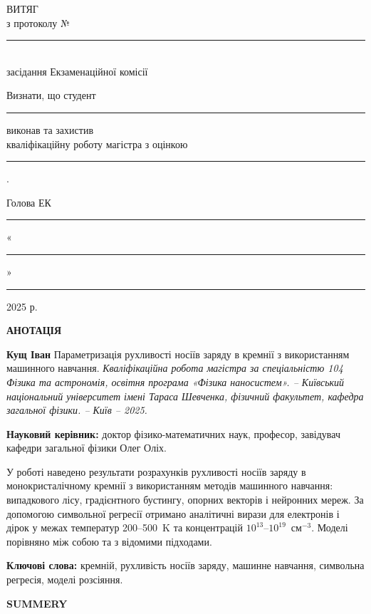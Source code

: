 \documentclass[14pt,a4paper,titlepage,oneside]{book}
\numberwithin{equation}{part}
\begin{document}
  \newpage
  \thispagestyle{empty}
  \begin{center}
  \Large ВИТЯГ \\[5mm]
  \large з протоколу №\rule{3cm}{0.4pt} \\[3mm]
  засідання Екзаменаційної комісії\\[10mm]
  
  \begin{minipage}{0.9\textwidth}

  Визнати, що студент \rule{8cm}{0.4pt} виконав та захистив\\
  кваліфікаційну роботу магістра з оцінкою \rule{4cm}{0.4pt}.\\[15mm]
  \end{minipage}
  
  Голова ЕК \rule{6cm}{0.4pt} \hfill «\rule{1cm}{0.4pt}» \rule{3cm}{0.4pt} 2025 р.
  \end{center}
  \newpage
  \begin{center}
      \Large \textbf{АНОТАЦІЯ }
  \end{center}

  \justifying
  \textbf{Кущ Іван} Параметризація рухливості носіїв заряду в кремнії з використанням машинного навчання. \textit{Кваліфікаційна робота магістра за спеціальністю 104 Фізика та астрономія, освітня програма «Фізика наносистем». – Київський національний університет імені Тараса Шевченка, фізичний факультет, кафедра загальної фізики. – Київ – 2025.}
  
  \noindent\textbf{Науковий керівник:} доктор фізико-математичних наук, професор, завідувач кафедри загальної фізики Олег Оліх.
  
  \par У роботі наведено результати розрахунків рухливості носіїв заряду в монокристалічному кремнії з використанням методів машинного навчання: випадкового лісу, градієнтного бустингу, опорних векторів і нейронних мереж. За допомогою символьної регресії отримано аналітичні вирази для електронів і дірок у межах температур 200–500~K та концентрацій $10^{13}$–$10^{19}$~см$^{-3}$. Моделі порівняно між собою та з відомими підходами.
  
  \noindent\textbf{Ключові слова:} кремній, рухливість носіїв заряду, машинне навчання, символьна регресія, моделі розсіяння.
  

  \vspace{2cm}
  
  \begin{center}
    \Large \textbf{SUMMERY}
  \end{center}
  
\end{document}
